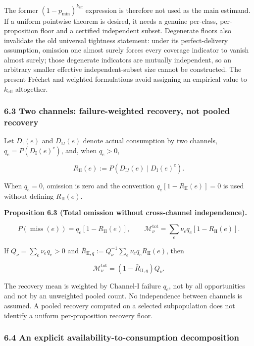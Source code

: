 \documentclass[
  11pt]{article}
\begin{document}
The former \((1-p_{\min})^{k_{\mathrm{eff}}}\) expression is therefore
not used as the main estimand. If a uniform pointwise theorem is
desired, it needs a genuine per-class, per-proposition floor and a
certified independent subset. Degenerate floors also invalidate the old
universal tightness statement: under its perfect-delivery assumption,
omission one almost surely forces every coverage indicator to vanish
almost surely; those degenerate indicators are mutually independent, so
an arbitrary smaller effective independent-subset size cannot be
constructed. The present Fréchet and weighted formulations avoid
assigning an empirical value to \(k_{\mathrm{eff}}\) altogether.

\subsubsection{6.3 Two channels: failure-weighted recovery, not pooled
recovery}\label{two-channels-failure-weighted-recovery-not-pooled-recovery}

Let \(D_{\mathrm I}(e)\) and \(D_{\mathrm II}(e)\) denote actual
consumption by two channels, \(q_e=P(D_{\mathrm I}(e)^c)\), and, when
\(q_e>0\),

\[R_{\mathrm{II}}(e):=P(D_{\mathrm II}(e)\mid D_{\mathrm I}(e)^c).\]

When \(q_e=0\), omission is zero and the convention
\(q_e[1-R_{\mathrm{II}}(e)]=0\) is used without defining
\(R_{\mathrm{II}}(e)\).

\textbf{Proposition 6.3 (Total omission without cross-channel
independence).}

\[P(\operatorname{miss}(e))=q_e[1-R_{\mathrm{II}}(e)],\qquad
\mathcal M_\nu^{\mathrm{tot}}=\sum_e\nu_eq_e[1-R_{\mathrm{II}}(e)].\]

If \(Q_\nu=\sum_e\nu_eq_e>0\) and
\(\bar R_{\mathrm{II},q}:=Q_\nu^{-1}\sum_e\nu_eq_eR_{\mathrm{II}}(e)\),
then

\[\mathcal M_\nu^{\mathrm{tot}}=(1-\bar R_{\mathrm{II},q})Q_\nu.\]

The recovery mean is weighted by Channel-I failure \(q_e\), not by all
opportunities and not by an unweighted pooled count. No independence
between channels is assumed. A pooled recovery computed on a selected
subpopulation does not identify a uniform per-proposition recovery
floor.

\subsubsection{6.4 An explicit availability-to-consumption
decomposition}\label{an-explicit-availability-to-consumption-decomposition}
\end{document}
